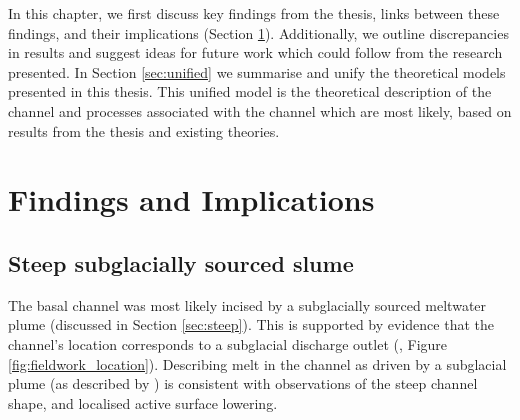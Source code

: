







In this chapter, we first  discuss key findings from the thesis, links between these findings, and their implications (Section \ref{sec:findings}). Additionally, we outline discrepancies in results and suggest ideas for future work which could follow from the research presented.
In Section \ref{sec:unified}  we summarise and unify the theoretical models presented in this thesis. This unified model is the theoretical description of the channel and processes associated with the channel which are most likely, based on results from the thesis and existing theories.


\section{Findings and Implications} \label{sec:findings}


\subsection{Steep subglacially sourced slume}

The basal channel was most likely incised by a subglacially sourced meltwater plume (discussed in Section \ref{sec:steep}). This is supported by evidence that the channel's location corresponds to a  subglacial discharge outlet (\cite{alley2016impacts,le2009subglacial}, Figure \ref{fig:fieldwork_location}).
Describing melt in the channel as driven by a subglacial plume (as described by \cite{jenkins1991one}) is consistent with observations of the steep channel shape, and localised active surface lowering.

